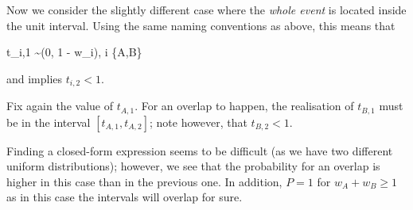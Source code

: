 Now we consider the slightly different case where the \emph{whole event} is located inside the unit interval. Using the same naming conventions as above, this means that

\bee
t_{i,1} \sim \Uc(0, 1 - w_i), \quad i \in \{A,B\}
\eee

and implies $t_{i,2} < 1$.

Fix again the value of $t_{A,1}$. For an overlap to happen, the realisation of $t_{B,1}$ must be in the interval $[t_{A,1}, t_{A,2}]$; note however, that $t_{B,2} < 1$.

Finding a closed-form expression seems to be difficult (as we have two different uniform distributions); however, we see that the probability for an overlap is higher in this case than in the previous one. In addition, $P = 1$ for $w_A + w_B \geq 1$ as in this case the intervals will overlap for sure.

